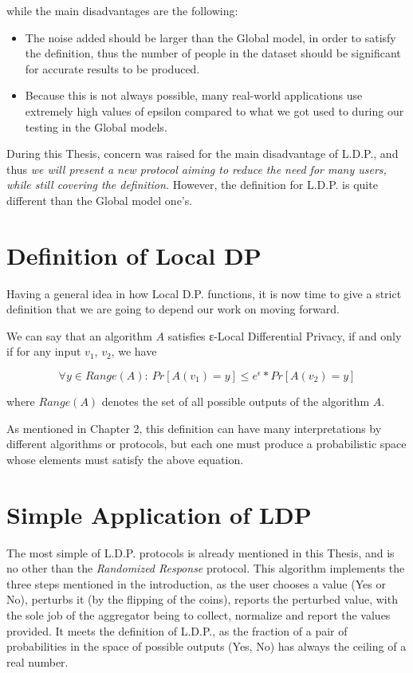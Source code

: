 while the main disadvantages are the following:

\begin{itemize}
    \item The noise added should be larger than the Global model, in order to satisfy the definition, thus the number of people in the dataset should be significant for accurate results to be produced.
    \item Because this is not always possible, many real-world applications use extremely high values of epsilon compared to what we got used to during our testing in the Global models.
\end{itemize}

During this Thesis, concern was raised for the main disadvantage of L.D.P., and thus\emph{ we will present a new protocol aiming to reduce the need for many users, while still covering the definition.} However, the definition for L.D.P. is quite different than the Global model one's.

\section{Definition of Local DP}

Having a general idea in how Local D.P. functions, it is now time to give a strict definition that we are going to depend our work on moving forward.

We can say that an algorithm $A$ satisfies ε-Local Differential Privacy, if and only if for any input $v_1$, $v_2$, we have

$$ \forall y \in Range(A):\ Pr[A(v_1) = y] \leq e^{\epsilon} * Pr[A(v_2) = y] $$

where $Range(A)$ denotes the set of all possible outputs of the algorithm $A$.

As mentioned in Chapter 2, this definition can have many interpretations by different algorithms or protocols, but each one must produce a probabilistic space whose elements must satisfy the above equation.


\section{Simple Application of LDP}

The most simple of L.D.P. protocols is already mentioned in this Thesis, and is no other than the \emph{Randomized Response} protocol. This algorithm implements the three steps mentioned in the introduction, as the user chooses a value (Yes or No), perturbs it (by the flipping of the coins), reports the perturbed value, with the sole job of the aggregator being to collect, normalize and report the values provided. It meets the definition of L.D.P., as the fraction of a pair of probabilities in the space of possible outputs (Yes, No) has always the ceiling of a real number. 


